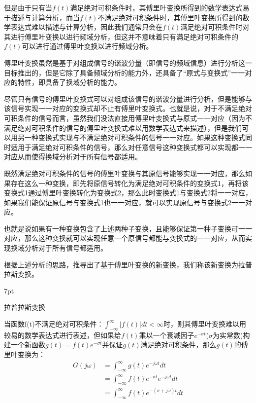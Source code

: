 \documentclass{article}
\numberwithin{equation}{section}
\numberwithin{figure}{section}
\newenvironment{formal}{%
\def\FrameCommand{%
\hspace{1pt}%
{\color{DarkBlue}\vrule width 2pt}%
{\color{formalshade}\vrule width 4pt}%
\colorbox{formalshade}%
}%
\MakeFramed{\advance\hsize-\width\FrameRestore}%
\noindent\hspace{-4.55pt}%
\begin{adjustwidth}{}{7pt}%
\vspace{2pt}\vspace{2pt}%
}
{%
\vspace{2pt}\end{adjustwidth}\endMakeFramed%
}
\begin{document}
但是由于只有当$f(t)$满足绝对可积条件时，其傅里叶变换所得到的数学表达式易于描述与计算分析，而当$f(t)$不满足绝对可积条件时，其傅里叶变换所得到的数学表达式难以描述与计算分析，因此我们通常只会在$f(t)$满足绝对可积条件时对其进行傅里叶变换以进行频域分析，但这并不意味着只有满足绝对可积条件的$f(t)$可以进行通过傅里叶变换以进行频域分析。

傅里叶变换虽然是基于对组成信号的谐波分量（即信号的频域信息）进行分析这一目标推出的，但是它除了具备频域分析的能力外，还具备了“原式与变换式”一一对应的特性，即具备了换域分析的能力。

尽管只有信号的傅里叶变换式可以对组成该信号的谐波分量进行分析，但是能够与该信号实现一一对应的变换式却不止有傅里叶变换式。也就是说，对于不满足绝对可积条件的信号而言，虽然我们没法直接用傅里叶变换式与原式一一对应（因为不满足绝对可积条件的信号的傅里叶变换式难以用数学表达式来描述），但是我们可以用另一种变换式实现与不满足绝对可积条件的信号一一对应。如果这种变换式同时适用于满足绝对可积条件的信号，那么对任意信号这种变换式都可以实现都一一对应从而使得换域分析对于所有信号都适用。

既然满足绝对可积条件的信号的傅里叶变换与其原信号能够实现一一对应，那么如果存在这么一种变换，即先将原信号转化为满足绝对可积条件的变换式1，再将该变换式1通过傅里叶变换转化为变换式2，那么此时变换式1与变换式2将一一对应，如果我们能保证原信号与变换式1也一一对应，就可以实现原信号与变换式2一一对应。

也就是说如果有一种变换包含了上述两种子变换，且能够保证第一种子变换可一一对应，那么这种变换就可以实现任意一个原信号都能与变换式的一一对应，从而实现换域分析对于所有信号都适用。

根据上述分析的思路，推导出了基于傅里叶变换的新变换，我们称该新变换为拉普拉斯变换。

\begin{formal}
    拉普拉斯变换
\end{formal}

当函数f(t)不满足绝对可积条件：$\int_{-\infty}^{\infty}|f(t)|dt<\infty$时，则其傅里叶变换难以用较易的数学表达式进行表述，但如果给$f(t)$乘以一个衰减因子$e^{-\sigma t}$($\sigma$为实常数)构建一个新函数$g(t)=f(t)e^{-\sigma t}$并保证$g(t)$满足绝对可积条件，那么$g(t)$的傅里叶变换为：
\begin{equation}
    \begin{split}
        G(j\omega)&=\int_{-\infty}^{\infty}g(t)e^{-j\omega t}dt\\
        &=\int_{-\infty}^{\infty}f(t)e^{-\sigma t}e^{-j\omega t}dt\\
        &=\int_{-\infty}^{\infty}f(t)e^{-(\sigma+j\omega) t}dt
    \end{split}\label{laplacetrans}
\end{equation}
\end{document}
